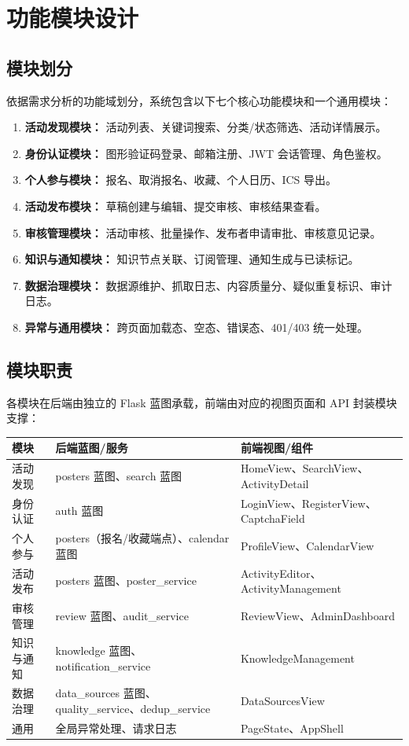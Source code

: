 \documentclass[12pt,a4paper]{ctexart}
\begin{document}
\section{功能模块设计}
\subsection{模块划分}
依据需求分析的功能域划分，系统包含以下七个核心功能模块和一个通用模块：
\begin{enumerate}
\item \textbf{活动发现模块：} 活动列表、关键词搜索、分类/状态筛选、活动详情展示。
\item \textbf{身份认证模块：} 图形验证码登录、邮箱注册、JWT 会话管理、角色鉴权。
\item \textbf{个人参与模块：} 报名、取消报名、收藏、个人日历、ICS 导出。
\item \textbf{活动发布模块：} 草稿创建与编辑、提交审核、审核结果查看。
\item \textbf{审核管理模块：} 活动审核、批量操作、发布者申请审批、审核意见记录。
\item \textbf{知识与通知模块：} 知识节点关联、订阅管理、通知生成与已读标记。
\item \textbf{数据治理模块：} 数据源维护、抓取日志、内容质量分、疑似重复标识、审计日志。
\item \textbf{异常与通用模块：} 跨页面加载态、空态、错误态、401/403 统一处理。
\end{enumerate}

\subsection{模块职责}
各模块在后端由独立的 Flask 蓝图承载，前端由对应的视图页面和 API 封装模块支撑：
\begin{tabularx}{\textwidth}{p{2.6cm}p{5.4cm}Y}
\toprule 模块 & 后端蓝图/服务 & 前端视图/组件 \\\midrule
活动发现 & posters 蓝图、search 蓝图 & HomeView、SearchView、ActivityDetail \\
身份认证 & auth 蓝图 & LoginView、RegisterView、CaptchaField \\
个人参与 & posters（报名/收藏端点）、calendar 蓝图 & ProfileView、CalendarView \\
活动发布 & posters 蓝图、poster\_service & ActivityEditor、ActivityManagement \\
审核管理 & review 蓝图、audit\_service & ReviewView、AdminDashboard \\
知识与通知 & knowledge 蓝图、notification\_service & KnowledgeManagement \\
数据治理 & data\_sources 蓝图、quality\_service、dedup\_service & DataSourcesView \\
通用 & 全局异常处理、请求日志 & PageState、AppShell \\
\bottomrule
\end{tabularx}
\end{document}
